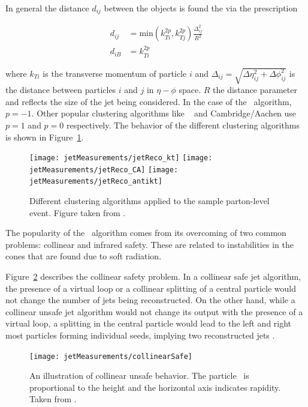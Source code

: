 In general the distance $d_{ij}$ between the objects is found the via the prescription

\begin{align}
d_{ij} &= \mathrm{min} (k_{Ti}^{2p} , k_{Tj}^{2p}) \frac{\Delta_{ij}^2}{R^2}  \\
d_{iB} &= k_{Ti}^{2p}
\end{align}

where $k_{Ti}$ is the transverse momentum of particle $i$ and $\Delta_{ij} = \sqrt{\Delta\eta_{ij}^2 + \Delta\phi_{ij}^2}$ is the distance between particles $i$ and $j$ in $\eta-\phi$ space. $R$ the distance parameter and reflects the size of the jet being considered. In the case of the \antikt\ algorithm, $p = -1$. Other popular clustering algorithms like \kt\ \cite{Catani:1993hr} and Cambridge/Aachen \cite{Dokshitzer:1997in} use $p = 1$ and $p=0$ respectively. The behavior of the different clustering algorithms is shown in Figure~\ref{fig:JetClustering}. 

\begin{figure}[htp]
\centering
\texttt{[image: jetMeasurements/jetReco\_kt]}\hfill
\texttt{[image: jetMeasurements/jetReco\_CA]}\hfill
\texttt{[image: jetMeasurements/jetReco\_antikt]}\hfill
\caption{Different clustering algorithms applied to the sample parton-level event. Figure taken from \cite{Cacciari:2008gp}.}
\label{fig:JetClustering}
\end{figure}

The popularity of the \antikt\ algorithm comes from its overcoming of two common problems: collinear and infrared safety. These are related to instabilities in the cones that are found due to soft radiation. 

Figure~\ref{fig:collinearSafe} describes the collinear safety problem. In a collinear safe jet algorithm, the presence of a virtual loop or a collinear splitting of a central particle would not change the number of jets being reconstructed. On the other hand, while a collinear unsafe jet algorithm would not change its output with the presence of a virtual loop, a splitting in the central particle would lead to the left and right most particles forming individual seeds, implying two reconstructed jets \cite{Salam:2009jx}.

\begin{figure}[htp]
\centering
\texttt{[image: jetMeasurements/collinearSafe]}
\caption{An illustration of collinear unsafe behavior. The particle \pt\ is proportional to the height and the horizontal axis indicates rapidity. Taken from \cite{Salam:2009jx}. }
\label{fig:collinearSafe}
\end{figure}


